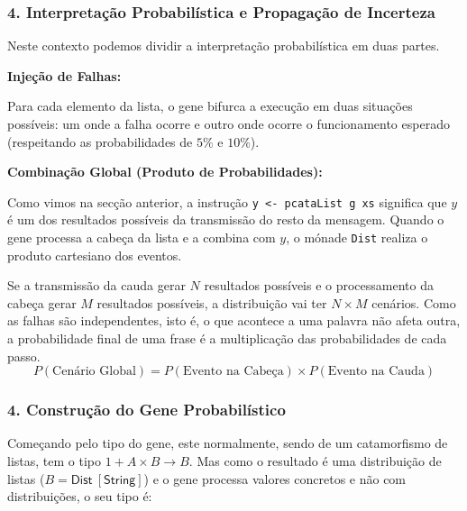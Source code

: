 \documentclass[11pt, a4paper, fleqn]{article}
\newcommand{\Conid}[1]{\mathit{#1}}
\newcommand{\Varid}[1]{\mathit{#1}}
\def\resethooks{%
  \global\let\SaveRestoreHook\empty
  \global\let\ColumnHook\empty}
\let\hspre\empty
\let\hspost\empty
\begin{document}
\subsubsection*{4. Interpretação Probabilística e Propagação de Incerteza}

\noindent Neste contexto podemos dividir a interpretação probabilística em duas partes.

\noindent \textbf{Injeção de Falhas:}

\noindent Para cada elemento da lista, o gene bifurca a execução em duas situações possíveis: um onde a falha ocorre e outro onde ocorre o funcionamento esperado (respeitando as probabilidades de $5\%$ e $10\%$).

\noindent \textbf{Combinação Global (Produto de Probabilidades):}

\noindent Como vimos na secção anterior, a instrução \texttt{y <- pcataList g xs} significa que $y$ é um dos resultados possíveis da transmissão do resto da mensagem.
Quando o gene processa a cabeça da lista e a combina com $y$, o mónade \texttt{Dist} realiza o produto cartesiano dos eventos.

\noindent Se a transmissão da cauda gerar $N$ resultados possíveis e o processamento da cabeça gerar $M$ resultados possíveis, a distribuição vai ter $N \times M$ cenários.
Como as falhas são independentes, isto é, o que acontece a uma palavra não afeta outra, a probabilidade final de uma frase é a multiplicação das probabilidades de cada passo.
$$ P(\text{Cenário Global}) = P(\text{Evento na Cabeça}) \times P(\text{Evento na Cauda}) $$

\subsubsection*{4. Construção do Gene Probabilístico}

\noindent Começando pelo tipo do gene, este normalmente, sendo de um catamorfismo de listas, tem o tipo $1 + A \times B \to B$.
Mas como o resultado é uma distribuição de listas ($B = \mathsf{Dist\ [String]}$) e o gene processa valores concretos e não com distribuições, o seu tipo é:
\resethooks
\end{document}
